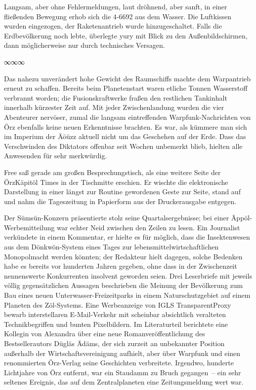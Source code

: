 Langsam, aber ohne Fehlermeldungen, laut dröhnend, aber sanft, in einer fließenden Bewegung erhob sich die 4-6692 aus dem Wasser. Die Luftkissen wurden eingezogen, der Raketenantrieb wurde hinzugeschaltet. Falls die Erdbevölkerung noch lebte, überlegte yury mit Blick zu den Außenbildschirmen, dann möglicherweise nur durch technisches Versagen.

\begin{center}
∞∞∞
\end{center}

Das nahezu unverändert hohe Gewicht des Raumschiffs machte dem Warpantrieb erneut zu schaffen. Bereits beim Planetenstart waren etliche Tonnen Wasserstoff verbrannt worden; die Fusionskraftwerke fraßen den restlichen Tankinhalt innerhalb kürzester Zeit auf. Mit jeder Zwischenlandung wurden die vier Abenteurer nervöser, zumal die langsam eintreffenden Warpfunk-Nachrichten von Örz ebenfalls keine neuen Erkenntnisse brachten. Es war, als kümmere man sich im Imperium der Äöüzz aktuell nicht um das Geschehen auf der Erde. Dass das Verschwinden des Diktators offenbar seit Wochen unbemerkt blieb, hielten alle Anwesenden für sehr merkwürdig.

Free saß gerade am großen Besprechungstisch, als eine weitere Seite der ÖrzKäpitöl Times in der Tischmitte erschien. Er wischte die elektronische Darstellung in einer längst zur Routine gewordenen Geste zur Seite, stand auf und nahm die Tageszeitung in Papierform aus der Druckerausgabe entgegen.

Der Sümsün-Konzern präsentierte stolz seine Quartalsergebnisse; bei einer Äppöl-Werbemitteilung war echter Neid zwischen den Zeilen zu lesen. Ein Journalist verkündete in einem Kommentar, er hielte es für möglich, dass die Insektenwesen aus dem Dönkwön-System eines Tages zur lebensmittelwirtschaftlichen Monopolmacht werden könnten; der Redakteur hielt dagegen, solche Bedenken habe es bereits vor hunderten Jahren gegeben, ohne dass in der Zwischenzeit nennenswerte Konkurrenten insolvent geworden seien. Drei Leserbriefe mit jeweils völlig gegensätzlichen Aussagen beschrieben die Meinung der Bevölkerung zum Bau eines neuen Unterwasser-Freizeitparks in einem Naturschutzgebiet auf einem Planeten des Zöl-Systems. Eine Werbeanzeige von IGLS TransparentProxy bewarb interstellaren E-Mail-Verkehr mit scheinbar absichtlich veralteten Technikbegriffen und bunten Pixelbildern. Im Literaturteil berichtete eine Kollegin von Alexandra über eine neue Romanveröffentlichung des Bestsellerautors Dügläs Ädäms, der sich zurzeit an unbekannter Position außerhalb der Wirtschaftsvereinigung aufhielt, aber über Warpfunk und einen renommierten Örz-Verlag seine Geschichten verbreitete. Irgendwo, hunderte Lichtjahre von Örz entfernt, war ein Staudamm zu Bruch gegangen~– ein sehr seltenes Ereignis, das auf dem Zentralplaneten eine Zeitungsmeldung wert war.

